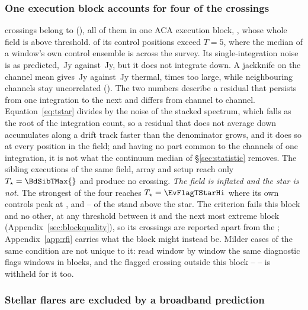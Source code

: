 \subsubsection{One execution block accounts for four of the crossings}
\label{sec:bdblock}

\BdNCross{} crossings belong to \BdStar{} (\BdAlias), all of them in one
ACA execution block, \texttt{\BdBlock}, whose whole field is above threshold.
\BdNCtrlAbove{} of its \BdNCtrl{} control positions exceed $T=5$, where the
median of a window's own control ensemble is \BdSurvCtrlMed{} across the
survey. Its single-integration noise is as predicted, \BdRmsMeas\,Jy against
\BdRmsPred\,Jy, but it does not integrate down. A jackknife on the channel
mean gives \BdJack\,Jy against \BdThermal\,Jy thermal, \BdJackRatio{} times
too large, while neighbouring channels stay uncorrelated (\BdChanCorr). The
two numbers describe a residual that persists from one integration to the next and differs from
channel to channel. Equation~\ref{eq:tstar} divides by the noise of the
stacked spectrum, which falls as the root of the integration count, so a
residual that does not average down accumulates along a drift track faster
than the denominator grows, and it does so at every position in the field; and
having no part common to the channels of one integration, it is not what the
continuum median of \S\ref{sec:statistic} removes. The \BdNSibling{}
sibling executions of the same field, array and setup reach only
$T_\star=\BdSibTMax{}$ and produce no crossing. \emph{The field is inflated and the star is not.} The strongest of the
four reaches $T_\star=\EvFlagTStarHi$ where its own controls peak at
\EvFlagCtrlAtHi, and \EvFlagNgeLo--\EvFlagNgeHi{} of the \BdNCtrl{} stand
above the star. The
criterion fails this block and no other, at any threshold between it and the
next most extreme block (Appendix~\ref{sec:blockquality}), so its
\BdNCross{} crossings are reported apart from the \EvNCrossQp{}; Appendix~\ref{app:rfi} carries what the block
might instead be. Milder cases of the same condition are not unique to it:
read window by window the same diagnostic flags \DqNWin{} windows in
\BkFlagNBlock{} blocks, and the \BkFlagNCrossOther{} flagged crossing outside
this block -- \BkFlagOtherStar{} -- is withheld for it too.

\subsubsection{Stellar flares are excluded by a broadband prediction}

